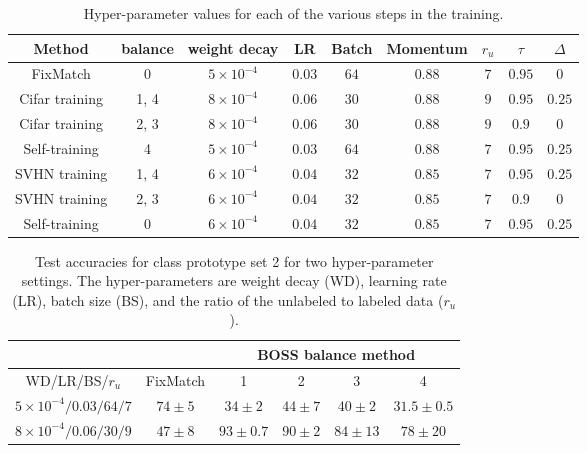 \documentclass[final]{cvpr}
\begin{document}
\begin{table*}[tb]
	\begin{center}
		\begin{tabular}{|c|c|c|c|c|c|c|c|c|}
			\hline
			Method  & balance & weight decay & LR & Batch & Momentum & $r_u$ & $\tau$ & $\Delta$   \\
			\hline\hline
			FixMatch & 0 & $ 5 \times 10^{-4} $  & $ 0.03 $  & $ 64 $ & $ 0.88 $ & $ 7 $ & $ 0.95 $ & $ 0 $   \\
			\hline
			Cifar training & 1, 4 & $ 8 \times 10^{-4} $  & $ 0.06 $  & $ 30 $ & $ 0.88 $ & $ 9 $ & $ 0.95 $ & $ 0.25 $  \\
			\hline
			Cifar training & 2, 3 & $ 8 \times 10^{-4} $  & $ 0.06 $  & $ 30 $ & $ 0.88 $ & $ 9 $ & $ 0.9 $ & $ 0 $   \\
			\hline
			Self-training & 4 & $ 5 \times 10^{-4} $  & $ 0.03 $  & $ 64 $ & $ 0.88 $ & $ 7 $ & $ 0.95 $ & $ 0.25 $  \\
			\hline
			SVHN training & 1, 4 & $ 6 \times 10^{-4} $  & $ 0.04 $  & $ 32 $ & $ 0.85 $ & $ 7 $ & $ 0.95 $ & $ 0.25 $  \\
			\hline
			SVHN training & 2, 3 & $ 6 \times 10^{-4} $  & $ 0.04 $  & $ 32 $ & $ 0.85 $ & $ 7 $ & $ 0.9 $ & $ 0 $  \\
			\hline
			Self-training & 0 & $ 6 \times 10^{-4} $  & $ 0.04 $  & $ 32 $ & $ 0.85 $ & $ 7 $ & $ 0.95 $ & $ 0.25 $  \\
			\hline
			
		\end{tabular}
	\end{center}
	\caption{Hyper-parameter values for each of the various steps in the training.
	}
	\label{tab:HP}
\end{table*}

\begin{table*}
	\begin{center}
		\begin{tabular}{|c|c|c|c|c|c|}
			\hline
			&  & \multicolumn{4}{|c|}{BOSS balance method}    \\
			\hline
			WD/LR/BS/$r_u$ & FixMatch & 1 & 2 & 3 & 4     \\
			\hline\hline
			$5 \times 10^{-4}/0.03/64/7$ & $ 74 \pm 5  $ & $ 34 \pm 2  $  &  $ 44 \pm 7  $  & $ 40 \pm 2   $  & $ 31.5  \pm 0.5  $   \\
			\hline
$8 \times 10^{-4}/0.06/30/9$ & $ 47 \pm 8 $ & $ 93 \pm 0.7 $  &  $ 90 \pm 2 $  & $ 84 \pm 13  $  & $ 78 \pm 20  $   \\
			\hline
			
			
		\end{tabular}
	\end{center}
	\caption{Test accuracies for class prototype set 2 for two  hyper-parameter settings. The hyper-parameters are weight decay (WD), learning rate (LR), batch size (BS), and the ratio of the unlabeled to labeled data ($r_u$).
	}
	\label{tab:set2HP}
\end{table*}
\end{document}
